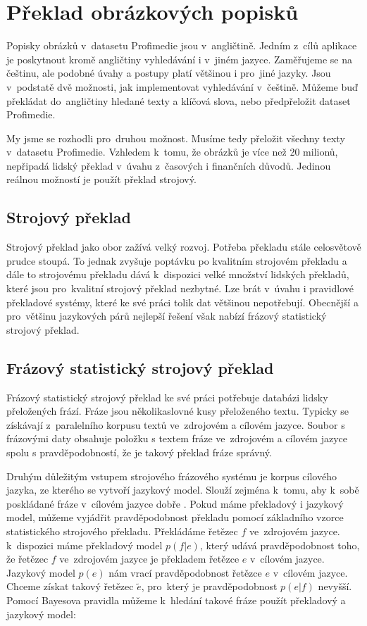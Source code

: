 \chapter{Překlad obrázkových popisků}
\label{chap:preklad}

Popisky obrázků v~datasetu Profimedie jsou v~angličtině. Jedním z~cílů aplikace je poskytnout kromě angličtiny vyhledávání i v~jiném jazyce. Zaměřujeme se na češtinu, ale podobné úvahy a postupy platí většinou i pro~jiné jazyky. Jsou v~podstatě dvě možnosti, jak implementovat vyhledávání v~češtině. Můžeme buď překládat do~angličtiny hledané texty a klíčová slova, nebo předpřeložit dataset Profimedie.

My jsme se rozhodli pro~druhou možnost. Musíme tedy přeložit všechny texty v~datasetu Profimedie. Vzhledem k~tomu, že obrázků je více než 20 milionů, nepřipadá lidský překlad v~úvahu z~časových i finančních důvodů. Jedinou reálnou možností je použít překlad strojový.

\section{Strojový překlad}

Strojový překlad jako obor zažívá velký rozvoj. Potřeba překladu stále celosvětově prudce stoupá\cite{translation-demand}. To jednak zvyšuje poptávku po kvalitním strojovém překladu a dále to strojovému překladu dává k~dispozici velké množství lidských překladů, které jsou pro~kvalitní strojový překlad nezbytné. Lze brát v~úvahu i pravidlové překladové systémy, které ke své práci tolik dat většinou nepotřebují\cite{apertium}. Obecnější a pro~většinu jazykových párů nejlepší řešení však nabízí frázový statistický strojový překlad\cite{koehn}.

\section{Frázový statistický strojový překlad}

 Frázový statistický strojový překlad ke své práci potřebuje databázi lidsky přeložených frází. Fráze jsou několikaslovné kusy přeloženého textu. Typicky se získávají z~paralelního korpusu textů ve~zdrojovém a cílovém jazyce. Soubor s frázovými daty obsahuje položku s textem fráze ve~zdrojovém a cílovém jazyce spolu s pravděpodobností, že je takový překlad fráze správný.

Druhým důležitým vstupem strojového frázového systému je korpus cílového jazyka, ze kterého se vytvoří jazykový model. Slouží zejména k~tomu, aby k~sobě poskládané fráze v~cílovém jazyce dobře . Pokud máme překladový i jazykový model, můžeme vyjádřit pravděpodobnost překladu pomocí základního vzorce statistického strojového překladu. Překládáme řetězec $f$ ve~zdrojovém jazyce. k~dispozici máme překladový model $p(f|e)$, který udává pravděpodobnost toho, že řetězec $f$ ve~zdrojovém jazyce je překladem řetězce $e$ v~cílovém jazyce. Jazykový model $p(e)$ nám vrací pravděpodobnost řetězce $e$ v~cílovém jazyce. Chceme získat takový řetězec $\tilde{e}$, pro~který je pravděpodobnost $p(e|f)$ nevyšší. Pomocí Bayesova pravidla můžeme k~hledání takové fráze použít překladový a jazykový model:

